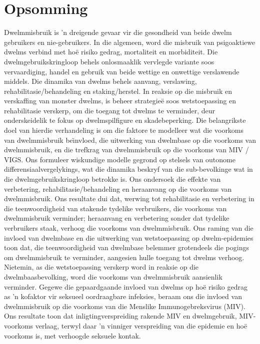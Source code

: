 \section*{Opsomming}
Dwelmmisbruik is 'n dreigende gevaar vir die gesondheid van beide dwelm gebruikers en nie-gebruikers. In die algemeen, word die misbruik van psigoaktiewe dwelms verbind met ho\"{e} risiko gedrag, mortaliteit en morbiditeit. Die dwelmgebruikskringloop behels onlosmaaklik vervlegde variante soos vervaardiging, handel en gebruik van beide wettige en onwettige verslawende middels. Die dinamika van dwelms behels aanvang, verslawing, rehabilitasie/behandeling en staking/herstel. In reaksie op die misbruik en verskaffing van monster dwelms, is beheer strategie\"{e} soos wetstoepassing en rehabilitasie verskerp, om die toegang tot dwelms te verminder, deur onderskeidelik te fokus op dwelmspilfigure en skadebeperking. 
Die belangrikste doel van hierdie verhandeling is om die faktore te modelleer wat die voorkoms van dwelmmisbruik be\"{\i}nvloed, die uitwerking van dwelmbase op die voorkoms van dwelmmisbruik, en die trefkrag van dwelmmisbruik op die voorkoms van MIV / VIGS. 
Ons formuleer wiskundige modelle gegrond op stelsels van outonome differensiaalvergelykings, wat die dinamika beskryf van die sub-bevolkinge wat in die dwelmgebruikskringloop betrokke is.   
Ons ondersoek die effekte van verbetering, rehabilitasie/behandeling en heraanvang op die voorkoms van dwelmmisbruik. 
Ons resultate dui dat, 
werwing tot rehabilitasie en verbetering in die teenwoordigheid van stakende tydelike verbruikers, die voorkoms van dwelmmisbruik verminder; heraanvang en verbetering sonder dat tydelike verbruikers staak, verhoog die voorkoms van dwelmmisbruik.
Ons raming van die invloed van dwelmbase en die uitwerking van wetstoepassing op dwelm-epidemies toon dat, die teenwoordigheid 
van dwelmbase belemmer grotendeels die pogings om dwelmmisbruik te verminder, aangesien hulle toegang tot dwelms verhoog. 
Nietemin, as die wetstoepassing verskerp word in reaksie op die dwelmbaasbevolking, word die voorkoms van dwelmmisbruik aansienlik verminder. 
Gegewe die gepaardgaande invloed van dwelms op ho\"{e} risiko gedrag as 'n kofaktor vir seksueel oordraagbare infeksies, beraam ons die invloed van dwelmmisbruik op die voorkoms van die Menslike Immunogebreksvirus (MIV). Ons resultate toon dat inligtingverspreiding rakende MIV en dwelmgebruik, MIV-voorkoms verlaag, terwyl daar 'n vinniger verspreiding van die epidemie en ho\"{e} voorkoms is, met verhoogde seksuele kontak.
